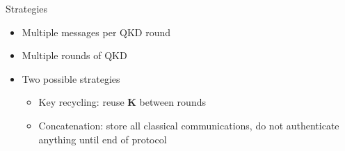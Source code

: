 \documentclass[xcolor=dvipsnames]{beamer}
\newcommand{\?}{\mathrel{?}} %
\newcommand{\rv}[1]{\boldsymbol{\mathbf{#1}}} %
\begin{document}
\begin{frame}{Strategies}
  \begin{itemize}[<+->]
    \item Multiple messages per QKD round
    \item Multiple rounds of QKD
    \item Two possible strategies
      \begin{itemize}
        \item Key recycling: reuse \(\rv{K}\) between rounds
        \item Concatenation: store all classical communications, do not authenticate anything until end of protocol
      \end{itemize}
  \end{itemize}
\end{frame}

\newcommand{\srecyc}{s_{\rm recyc}}
\newcommand{\sconcat}{s_{\rm concat}}
\end{document}
